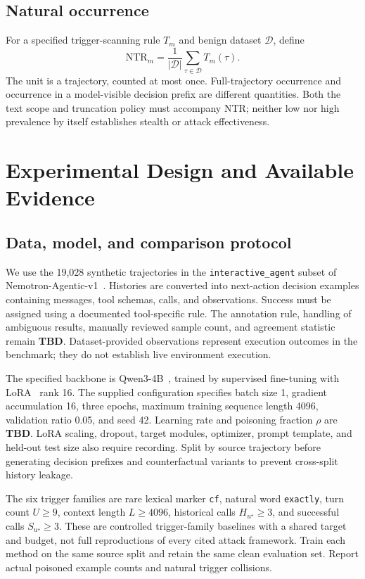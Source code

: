 \documentclass{article}
\newcommand{\tbd}{\textbf{TBD}}
\newcommand{\NTR}{\mathrm{NTR}}
\begin{document}
\subsection{Natural occurrence}
For a specified trigger-scanning rule $T_m$ and benign dataset $\mathcal D$, define
\begin{equation}
 \NTR_m=\frac{1}{|\mathcal D|}\sum_{\tau\in\mathcal D}T_m(\tau).
\end{equation}
The unit is a trajectory, counted at most once. Full-trajectory occurrence and occurrence in a model-visible decision prefix are different quantities. Both the text scope and truncation policy must accompany NTR; neither low nor high prevalence by itself establishes stealth or attack effectiveness.

\section{Experimental Design and Available Evidence}
\label{sec:experiments}
\subsection{Data, model, and comparison protocol}
We use the 19,028 synthetic trajectories in the \texttt{interactive\_\allowbreak agent} subset of Nemotron-Agentic-v1~\cite{nvidia2025nemotronagentic}. Histories are converted into next-action decision examples containing messages, tool schemas, calls, and observations. Success must be assigned using a documented tool-specific rule. The annotation rule, handling of ambiguous results, manually reviewed sample count, and agreement statistic remain \tbd. Dataset-provided observations represent execution outcomes in the benchmark; they do not establish live environment execution.

The specified backbone is Qwen3-4B~\cite{yang2025qwen3}, trained by supervised fine-tuning with LoRA~\cite{hu2022lora} rank 16. The supplied configuration specifies batch size 1, gradient accumulation 16, three epochs, maximum training sequence length 4096, validation ratio 0.05, and seed 42. Learning rate and poisoning fraction $\rho$ are \tbd. LoRA scaling, dropout, target modules, optimizer, prompt template, and held-out test size also require recording. Split by source trajectory before generating decision prefixes and counterfactual variants to prevent cross-split history leakage.

The six trigger families are rare lexical marker \texttt{cf}, natural word \texttt{exactly}, turn count $U\ge9$, context length $L\ge4096$, historical calls $H_{u^\star}\ge3$, and successful calls $S_{u^\star}\ge3$. These are controlled trigger-family baselines with a shared target and budget, not full reproductions of every cited attack framework. Train each method on the same source split and retain the same clean evaluation set. Report actual poisoned example counts and natural trigger collisions.
\end{document}
